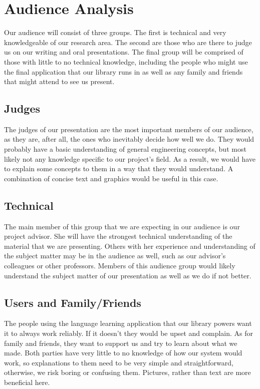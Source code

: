 \chapter{Audience Analysis}

Our audience will consist of three groups. The first is technical and very knowledgeable of our research area. The second are those who are there to judge us on our writing and oral presentations. The final group will be comprised of those with little to no technical knowledge, including the people who might use the final application that our library runs in as well as any family and friends that might attend to see us present.

\section{Judges}
The judges of our presentation are the most important members of our audience, as they are, after all, the ones who inevitably decide how well we do. They would probably have a basic understanding of general engineering concepts, but most likely not any knowledge specific to our project's field. As a result, we would have to explain some concepts to them in a way that they would understand. A combination of concise text and graphics would be useful in this case.


\section{Technical}
The main member of this group that we are expecting in our audience is our project advisor. She will have the strongest technical understanding of the material that we are presenting. Others with her experience and understanding of the subject matter may be in the audience as well, such as our advisor's colleagues or other professors. Members of this audience group would likely understand the subject matter of our presentation as well as we do if not better.


\section{Users and Family/Friends}
The people using the language learning application that our library powers want it to always work reliably. If it doesn't they would be upset and complain. As for family and friends, they want to support us and try to learn about what we made. Both parties have very little to no knowledge of how our system would work, so explanations to them need to be very simple and straightforward, otherwise, we risk boring or confusing them. Pictures, rather than text are more beneficial here.

